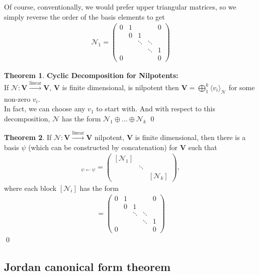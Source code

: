\documentclass{article}
\theoremstyle{definition}
\newtheorem{thm}{Theorem}[section]
\newcommand{\V}{\mathbf{V}}
\newcommand{\lin}{\overset{\text{linear}}{\longrightarrow}}
\begin{document}
Of course, conventionally, we would prefer upper triangular matrices, so we simply reverse the order of the basis elements to get 
\begin{align*}
\mathcal{N}_1 = \begin{pmatrix}
0 & 1 &  && 0\\
  & 0 & 1 && \\
 & & \ddots& \ddots & \\
&  & &\ddots&1\\
0 &  &  && 0
\end{pmatrix}
\end{align*}

\begin{thm} \textbf{Cyclic Decomposition for Nilpotents:} \\
	If $\mathcal{N} : \V \lin \V$, $\V$ is finite dimensional, is nilpotent then $\V = \bigoplus^k_{1} \langle v_i \rangle_\mathcal{N}$ for some non-zero $v_i$.\\
	
	In fact, we can choose any $v_1$ to start with. And with respect to this decomposition, $\mathcal{N}$ has the form $\mathcal{N}_1 \oplus \dots \oplus \mathcal{N}_k$ \qed
\end{thm}


\begin{thm}
	If $\mathcal{N}: \V \lin \V$ nilpotent, $\V$ is finite dimensional, then there is a basis $\psi$ (which can be constructed by concatenation) for $\V$ such that 
	\begin{align*}
	[\mathcal{N}]_{\psi \leftarrow \psi} = \begin{pmatrix}
	[\mathcal{N}_1] & & \\
	& \ddots &\\
	& & [\mathcal{N}_k]
	\end{pmatrix} ,
	\end{align*}
	where each block $[\mathcal{N}_i]$ has the form
	\begin{align*}
	[\mathcal{N}_i] = \begin{pmatrix}
	0 & 1 &  && 0\\
	& 0 & 1 && \\
	& & \ddots& \ddots & \\
	&  & &\ddots&1\\
	0 &  &  && 0
	\end{pmatrix}
	\end{align*}\qed
\end{thm}


\subsection{Jordan canonical form theorem}
\end{document}
